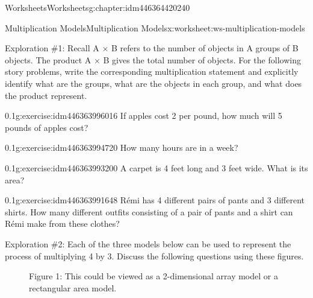 \documentclass[twoside,11pt,]{book}
\begin{document}
\begin{chapterptx}{Worksheets}{}{Worksheets}{}{}{g:chapter:idm446364420240}
%
\begin{worksheet-section-numberless}{Multiplication Models}{}{Multiplication Models}{}{}{x:worksheet:ws-multiplication-models}
\begin{introduction}{}%
Exploration \#1: Recall A \(\times \) B refers to the number of objects in A groups of B objects.  The product A \(\times \) B gives the total number of objects.  For the following story problems, write the corresponding multiplication statement and explicitly identify what are the groups, what are the objects in each group, and what does the product represent.%
\end{introduction}%
\begin{divisionexercise}{1}{}{0.1}{g:exercise:idm446363996016}%
If apples cost \textdollar{}2 per pound, how much will 5 pounds of apples cost?%
\end{divisionexercise}%
\begin{divisionexercise}{2}{}{0.1}{g:exercise:idm446363994720}%
How many hours are in a week?%
\end{divisionexercise}%
\begin{divisionexercise}{3}{}{0.1}{g:exercise:idm446363993200}%
A carpet is 4 feet long and 3 feet wide. What is its area?%
\end{divisionexercise}%
\begin{divisionexercise}{4}{}{0.1}{g:exercise:idm446363991648}%
Rémi has 4 different pairs of pants and 3 different shirts. How many different outfits consisting of a pair of pants and a shirt can Rémi make from these clothes?%
\end{divisionexercise}%
\clearpage
\begin{introduction}{}%
Exploration \#2: Each of the three models below can be used to represent the process of multiplying 4 by 3.  Discuss the following questions using these figures.%
%
\begin{description}
\item[{}]Figure 1: This could be viewed as a 2-dimensional array model or a rectangular area model. \begin{sidebyside}{1}{0.45}{0.45}{0}%
\begin{sbspanel}{0.1}%

\end{sbspanel}
\end{sidebyside}
\end{description}
\end{introduction}
\end{worksheet-section-numberless}
\end{chapterptx}
\end{document}
